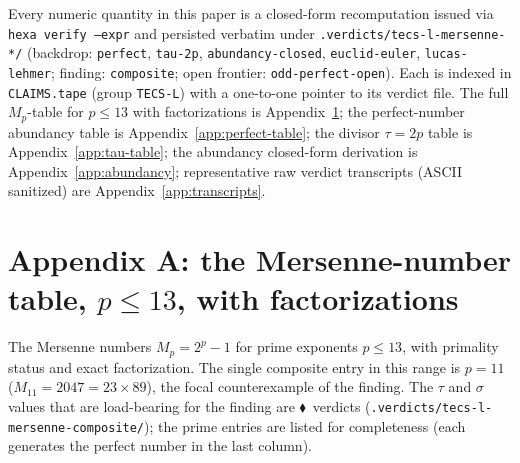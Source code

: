 \documentclass[11pt,a4paper]{article}
\newcommand{\tierF}{\textcolor{blue!60!black}{$\blacklozenge$}}   %
\newcommand{\sig}{\sigma}
\newcommand{\Mp}{M_p}
\theoremstyle{definition}
\begin{document}
Every numeric quantity in this paper is a closed-form recomputation issued via
\texttt{hexa verify --expr} and persisted verbatim under
\texttt{.verdicts/tecs-l-mersenne-*/} (backdrop: \texttt{perfect},
\texttt{tau-2p}, \texttt{abundancy-closed}, \texttt{euclid-euler},
\texttt{lucas-lehmer}; finding: \texttt{composite}; open frontier:
\texttt{odd-perfect-open}). Each is indexed in \texttt{CLAIMS.tape} (group
\texttt{TECS-L}) with a one-to-one pointer to its verdict file. The full
$M_p$-table for $p\le 13$ with factorizations is Appendix~\ref{app:mp-table}; the
perfect-number abundancy table is Appendix~\ref{app:perfect-table}; the divisor
$\tau=2p$ table is Appendix~\ref{app:tau-table}; the abundancy closed-form
derivation is Appendix~\ref{app:abundancy}; representative raw verdict transcripts
(ASCII sanitized) are Appendix~\ref{app:transcripts}.




\appendix

\section{Appendix A: the Mersenne-number table, $p\le 13$, with factorizations}
\label{app:mp-table}

The Mersenne numbers $\Mp = 2^p-1$ for prime exponents $p\le 13$, with primality
status and exact factorization. The single composite entry in this range is
$p=11$ ($M_{11}=2047=23\times 89$), the focal counterexample of the finding. The
$\tau$ and $\sig$ values that are load-bearing for the finding are \tierF\
verdicts (\texttt{.verdicts/tecs-l-mersenne-composite/}); the prime entries are
listed for completeness (each generates the perfect number in the last column).
\end{document}
